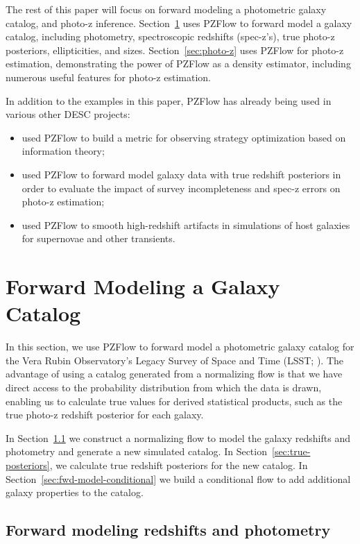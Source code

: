 \documentclass[twocolumn,twocolappendix]{aastex631}
\begin{document}
The rest of this paper will focus on forward modeling a photometric galaxy catalog, and photo-z inference.
Section~\ref{sec:galaxy-catalog} uses PZFlow to forward model a galaxy catalog, including photometry, spectroscopic redshifts (spec-z's), true photo-z posteriors, ellipticities, and sizes.
Section~\ref{sec:photo-z} uses PZFlow for photo-z estimation, demonstrating the power of PZFlow as a density estimator, including numerous useful features for photo-z estimation.

In addition to the examples in this paper, PZFlow has already being used in various other DESC projects:
\begin{itemize}
    \item \citet{malz2021} used PZFlow to build a metric for observing strategy optimization based on information theory;
    \item \citet{stylianou2022} used PZFlow to forward model galaxy data with true redshift posteriors in order to evaluate the impact of survey incompleteness and spec-z errors on photo-z estimation;
    \item \citet{lokken2022} used PZFlow to smooth high-redshift artifacts in simulations of host galaxies for supernovae and other transients.
\end{itemize}


\section{Forward Modeling a Galaxy Catalog}
\label{sec:galaxy-catalog}

In this section, we use PZFlow to forward model a photometric galaxy catalog for the Vera Rubin Observatory's Legacy Survey of Space and Time (LSST; \citealt{ivezic2019}).
The advantage of using a catalog generated from a normalizing flow is that we have direct access to the probability distribution from which the data is drawn, enabling us to calculate true values for derived statistical products, such as the true photo-z redshift posterior for each galaxy.

In Section~\ref{sec:fwd-model} we construct a normalizing flow to model the galaxy redshifts and photometry and generate a new simulated catalog.
In Section~\ref{sec:true-posteriors}, we calculate true redshift posteriors for the new catalog.
In Section~\ref{sec:fwd-model-conditional} we build a conditional flow to add additional galaxy properties to the catalog.

\subsection{Forward modeling redshifts and photometry}
\label{sec:fwd-model}
\end{document}
